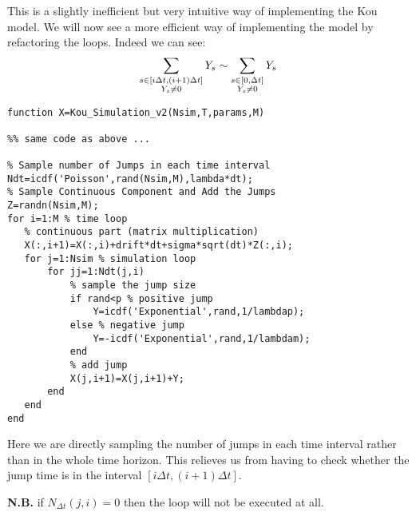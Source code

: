 This is a slightly inefficient but very intuitive way of implementing the Kou
model. We will now see a more efficient way of implementing the model by 
refactoring the loops.
Indeed we can see:
\[ \sum_{\begin{subarray}{c} s\in[i\Delta t, (i+1)\Delta t] \\ Y_s \neq 0
\end{subarray}} Y_s \sim \sum_{\begin{subarray}{c} s\in[0, \Delta t] \\ Y_s \neq
0 \end{subarray}} Y_s \]

\begin{verbatim}
function X=Kou_Simulation_v2(Nsim,T,params,M)

%% same code as above ...

% Sample number of Jumps in each time interval
Ndt=icdf('Poisson',rand(Nsim,M),lambda*dt);
% Sample Continuous Component and Add the Jumps
Z=randn(Nsim,M);
for i=1:M % time loop
   % continuous part (matrix multiplication)
   X(:,i+1)=X(:,i)+drift*dt+sigma*sqrt(dt)*Z(:,i);
   for j=1:Nsim % simulation loop
       for jj=1:Ndt(j,i)
           % sample the jump size
           if rand<p % positive jump
               Y=icdf('Exponential',rand,1/lambdap);
           else % negative jump
               Y=-icdf('Exponential',rand,1/lambdam);
           end
           % add jump
           X(j,i+1)=X(j,i+1)+Y;
       end
   end
end
\end{verbatim}

Here we are directly sampling the number of jumps in each time interval rather
than in the whole time horizon. This relieves us from having to check whether
the jump time is in the interval $[i\Delta t, (i+1)\Delta t]$.

\textbf{N.B.} if $N_{\Delta t}(j,i) = 0$ then the loop will not be executed at
all.


